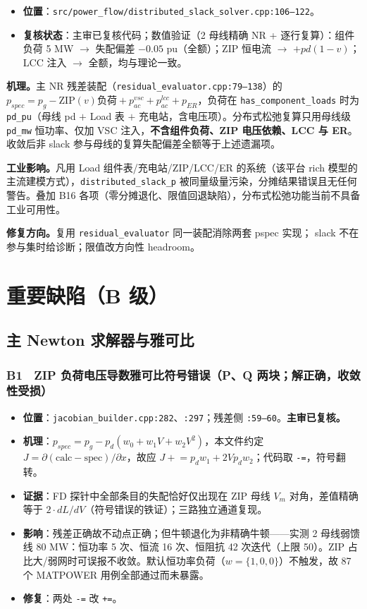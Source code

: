\documentclass[11pt,a4paper,fontset=fandol]{ctexart}
\newcommand{\file}[1]{\texttt{#1}}
\begin{document}
\begin{itemize}
  \item \textbf{位置}：\file{src/power\_flow/distributed\_slack\_solver.cpp:106--122}。
  \item \textbf{复核状态}：主审已复核代码；数值验证（2 母线精确 NR + 逐行复算）：组件负荷 5 MW $\to$ 失配偏差 $-0.05$ pu（全额）；ZIP 恒电流 $\to$ $+pd(1-v)$；LCC 注入 $\to$ 全额，均与理论一致。
\end{itemize}

\textbf{机理。}主 NR 残差装配（\file{residual\_evaluator.cpp:79--138}）的 $p_{spec}=p_g-\mathrm{ZIP}(v)\text{负荷}+p_{ac}^{vsc}+p_{ac}^{lcc}+p_{ER}$，负荷在 \file{has\_component\_loads} 时为 \file{pd\_pu}（母线 pd $+$ Load 表 $+$ 充电站，含电压项）。分布式松弛复算只用母线级 \file{pd\_mw} 恒功率、仅加 VSC 注入，\textbf{不含组件负荷、ZIP 电压依赖、LCC 与 ER}。收敛后非 slack 参与母线的复算失配偏差全额等于上述遗漏项。

\textbf{工业影响。}凡用 Load 组件表/充电站/ZIP/LCC/ER 的系统（该平台 rich 模型的主流建模方式），\file{distributed\_slack\_p} 被同量级量污染，分摊结果错误且无任何警告。叠加 B16 各项（零分摊退化、限值回退缺陷），分布式松弛功能当前不具备工业可用性。

\textbf{修复方向。}复用 \file{residual\_evaluator} 同一装配消除两套 pspec 实现； slack 不在参与集时给诊断；限值改方向性 headroom。

\newpage
\section{重要缺陷（B 级）}
\label{sec:major}

\subsection{主 Newton 求解器与雅可比}

\subsubsection*{B1　ZIP 负荷电压导数雅可比符号错误（P、Q 两块；解正确，收敛性受损）}
\begin{itemize}
  \item \textbf{位置}：\file{jacobian\_builder.cpp:282}、\file{:297}；残差侧 \file{:59--60}。\textbf{主审已复核。}
  \item \textbf{机理}：$p_{spec}=p_g-p_d(w_0+w_1V+w_2V^2)$，本文件约定 $J=\partial(\mathrm{calc}-\mathrm{spec})/\partial x$，故应 $J \mathrel{+}= p_d w_1 + 2V p_d w_2$；代码取 \texttt{-=}，符号翻转。
  \item \textbf{证据}：FD 探针中全部条目的失配恰好仅出现在 ZIP 母线 $V_m$ 对角，差值精确等于 $2\cdot dL/dV$（符号错误的铁证）；三路独立通道复现。
  \item \textbf{影响}：残差正确故不动点正确；但牛顿退化为非精确牛顿——实测 2 母线弱馈线 80 MW：恒功率 5 次、恒流 16 次、恒阻抗 42 次迭代（上限 50）。ZIP 占比大/弱网时可误报不收敛。默认恒功率负荷（$w=\{1,0,0\}$）不触发，故 87 个 MATPOWER 用例全部通过而未暴露。
  \item \textbf{修复}：两处 \texttt{-=} 改 \texttt{+=}。
\end{itemize}
\end{document}
